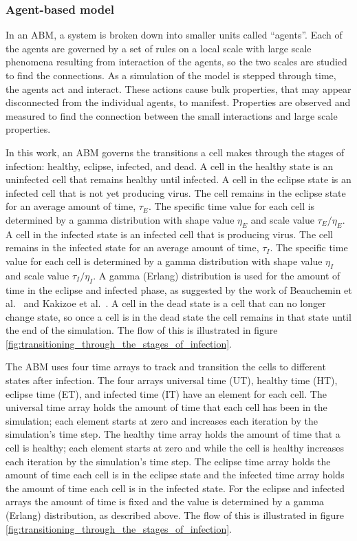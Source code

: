 \subsubsection{Agent-based model} \label{ABM}

In an ABM, a system is broken down into smaller units called ``agents''. Each of the agents are governed by a set of rules on a local scale with large scale phenomena resulting from interaction of the agents, so the two scales are studied to find the connections. As a simulation of the model is stepped through time, the agents act and interact. These actions cause bulk properties, that may appear disconnected from the individual agents, to manifest. Properties are observed and measured to find the connection between the small interactions and large scale properties.

In this work, an ABM governs the transitions a cell makes through the stages of infection: healthy, eclipse, infected, and dead. A cell in the healthy state is an uninfected cell that remains healthy until infected. A cell in the eclipse state is an infected cell that is not yet producing virus. The cell remains in the eclipse state for an average amount of time, $\tau_E$. The specific time value for each cell is determined by a gamma distribution with shape value $\eta_E$ and scale value $\tau_E/\eta_E$. A cell in the infected state is an infected cell that is producing virus. The cell remains in the infected state for an average amount of time, $\tau_I$. The specific time value for each cell is determined by a gamma distribution with shape value $\eta_I$ and scale value $\tau_I/\eta_I$. A gamma (Erlang) distribution is used for the amount of time in the eclipse and infected phase, as suggested by the work of Beauchemin et al.\ \cite{beauchemin17} and Kakizoe et al.\ \cite{kakizoe15}. A cell in the dead state is a cell that can no longer change state, so once a cell is in the dead state the cell remains in that state until the end of the simulation. The flow of this is illustrated in figure \ref{fig:transitioning_through_the_stages_of_infection}.

The ABM uses four time arrays to track and transition the cells to different states after infection. The four arrays universal time (UT), healthy time (HT), eclipse time (ET), and infected time (IT) have an element for each cell. The universal time array holds the amount of time that each cell has been in the simulation; each element starts at zero and increases each iteration by the simulation's time step. The healthy time array holds the amount of time that a cell is healthy; each element starts at zero and while the cell is healthy increases each iteration by the simulation's time step. The eclipse time array holds the amount of time each cell is in the eclipse state and the infected time array holds the amount of time each cell is in the infected state. For the eclipse and infected arrays the amount of time is fixed and the value is determined by a gamma (Erlang) distribution, as described above. The flow of this is illustrated in figure \ref{fig:transitioning_through_the_stages_of_infection}.

